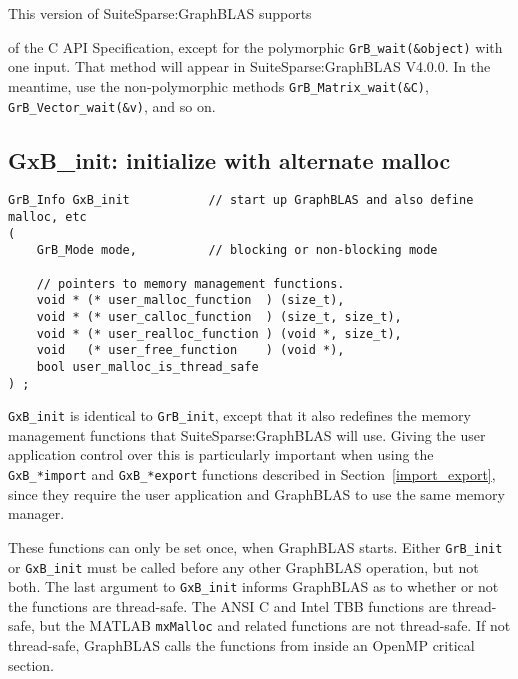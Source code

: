 \documentclass[12pt]{article}
\begin{document}
This version of SuiteSparse:GraphBLAS supports

of the C API Specification,
except for the polymorphic \verb'GrB_wait(&object)' with one input.
That method will appear in SuiteSparse:GraphBLAS V4.0.0.  In the meantime, use
the non-polymorphic methods \verb'GrB_Matrix_wait(&C)',
\verb'GrB_Vector_wait(&v)', and so on.

\subsection{{\sf GxB\_init:} initialize with alternate malloc} %
\label{xinit}

\begin{mdframed}[userdefinedwidth=6in]
{\footnotesize
\begin{verbatim}
GrB_Info GxB_init           // start up GraphBLAS and also define malloc, etc
(
    GrB_Mode mode,          // blocking or non-blocking mode

    // pointers to memory management functions.
    void * (* user_malloc_function  ) (size_t),
    void * (* user_calloc_function  ) (size_t, size_t),
    void * (* user_realloc_function ) (void *, size_t),
    void   (* user_free_function    ) (void *),
    bool user_malloc_is_thread_safe
) ;
\end{verbatim}
}\end{mdframed}

\verb'GxB_init' is identical to \verb'GrB_init', except that it also redefines
the memory management functions that SuiteSparse:GraphBLAS will use.  Giving
the user application control over this is particularly important when using the
\verb'GxB_*import' and \verb'GxB_*export' functions described in
Section~\ref{import_export}, since they require the user application and
GraphBLAS to use the same memory manager.

These
functions can only be set once, when GraphBLAS starts.   Either \verb'GrB_init'
or \verb'GxB_init' must be called before any other GraphBLAS operation, but
not both.  The last argument to \verb'GxB_init' informs GraphBLAS as to
whether or not the functions are thread-safe.  The ANSI C and Intel TBB
functions are thread-safe, but the MATLAB \verb'mxMalloc' and related
functions are not thread-safe.  If not thread-safe, GraphBLAS calls
the functions from inside an OpenMP critical section.
\end{document}
